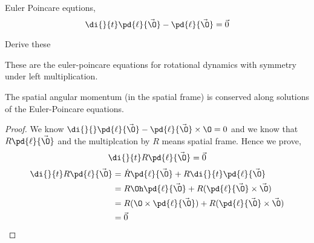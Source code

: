 
Euler Poincare equtions,
$$ \di {}{t} \pd{\ell}{\vec\O} - \pd{\ell}{\vec\O} = \vec 0 $$
\begin{exercise}
  Derive these
\end{exercise}
These are the euler-poincare equations for rotational dynamics with symmetry under left multiplication.

\begin{nthm}[]
  The spatial angular momentum (in the spatial frame) is conserved along solutions of the Euler-Poincare equations.
\end{nthm}
\begin{proof}
  We know $\di {}{}\pd{\ell}{\vec \O} - \pd{\ell}{\vec \O} \times \O = 0$ and we know that $R\pd{\ell}{\vec\O}$ and the multiplcation by $R$ means spatial frame. Hence we prove,
  $$ \di{}{t} R\pd{\ell}{\vec \O} = \vec 0$$
  \begin{align*}
    \di{}{t} R\pd{\ell}{\vec \O} &= \dot R \pd{\ell}{\vec \O} + R\di { }{t} \pd{\ell}{\vec\O}\\
    &= R\Oh\pd{\ell}{\vec\O} + R(\pd{\ell}{\vec \O} \times \vec\O)\\
    &= R(\O \times \pd{\ell}{\vec\O}) + R(\pd{\ell}{\vec \O} \times \vec\O)\\
    &= \vec 0
\end{align*}
\end{proof}


